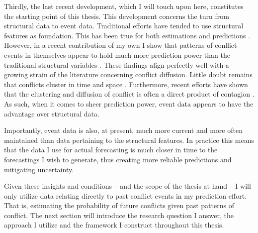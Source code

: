 \documentclass[a4paper]{article}
\begin{document}
Thirdly, the last recent development, which I will touch upon here, constitutes the starting point of this thesis. This development concerns the turn from structural data to event data. Traditional efforts have tended to use structural features as foundation. This has been true for both estimations and predictions \cite[10]{chadefaux2017conflict}. However, in a recent contribution of my own I show that patterns of conflict events in themselves appear to hold much more prediction power than the traditional structural variables \citep{Maase}. These findings align perfectly well with a growing strain of the literature concerning conflict diffusion. Little doubt remains that conflicts cluster in time and space \citep[15]{crost2015conflict}. Furthermore, recent efforts have shown that the clustering and diffusion of conflict is often a direct product of contagion \citep{buhaug2008contagion,schutte2011diffusion,crost2015conflict,bara_2017}. As such, when it comes to sheer prediction power, event data appears to have the advantage over structural data.\par

Importantly, event data is also, at present, much more current and more often maintained than data pertaining to the structural features. In practice this means that the data I use for actual forecasting is much closer in time to the forecastings I wish to generate, thus creating more reliable predictions and mitigating uncertainty.\par

Given these insights and conditions -- and the scope of the thesis at hand -- I will only utilize data relating directly to past conflict events in my prediction effort. That is, estimating the probability of future conflicts given past patterns of conflict. The next section will introduce the research question I answer, the approach I utilize and the framework I construct throughout this thesis.\par


\end{document}

